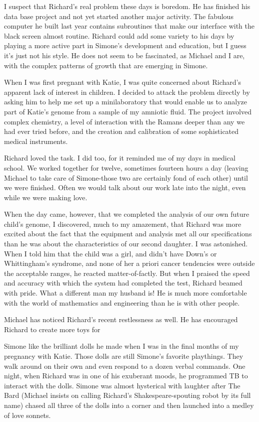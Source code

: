 \documentclass[]{article}
\begin{document}
I suspect that Richard’s real problem these days is boredom.  He has finished his data base project and not yet started another major activity.  The fabulous computer he built last year contains subroutines that make our interface with the black screen almost routine.  Richard could add some variety to his days by playing a more active part in Simone’s development and education, but I guess it’s just not his style.  He does not seem to be fascinated, as Michael and I are, with the complex patterns of growth that are emerging in Simone.

When I was first pregnant with Katie, I was quite concerned about Richard’s apparent lack of interest in children.  I decided to attack the problem directly by asking him to help me set up a minilaboratory that would enable us to analyze part of Katie’s genome from a sample of my amniotic fluid.  The project involved complex chemistry, a level of interaction with the Ramans deeper than any we had ever tried before, and the creation and calibration of some sophisticated medical instruments.

Richard loved the task.  I did too, for it reminded me of my days in medical school.  We worked together for twelve, sometimes fourteen hours a day (leaving Michael to take care of Simone-those two are certainly fond of each other) until we were finished.  Often we would talk about our work late into the night, even while we were making love.

When the day came, however, that we completed the analysis of our own future child’s genome, I discovered, much to my amazement, that Richard was more excited about the fact that the equipment and analysis met all our specifications than he was about the characteristics of our second daughter.  I was astonished.  When I told him that the child was a girl, and didn’t have Down’s or Whittingham’s syndrome, and none of her a priori cancer tendencies were outside the acceptable ranges, he reacted matter-of-factly.  But when I praised the speed and accuracy with which the system had completed the test, Richard beamed with pride.  What a different man my husband is! He is much more comfortable with the world of mathematics and engineering than he is with other people.

Michael has noticed Richard’s recent restlessness as well.  He has encouraged Richard to create more toys for

Simone like the brilliant dolls he made when I was in the final months of my pregnancy with Katie.  Those dolls are still Simone’s favorite playthings.  They walk around on their own and even respond to a dozen verbal commands.  One night, when Richard was in one of his exuberant moods, he programmed TB to interact with the dolls.  Simone was almost hysterical with laughter after The Bard (Michael insists on calling Richard’s Shakespeare-spouting robot by its full name) chased all three of the dolls into a corner and then launched into a medley of love sonnets.
\end{document}
